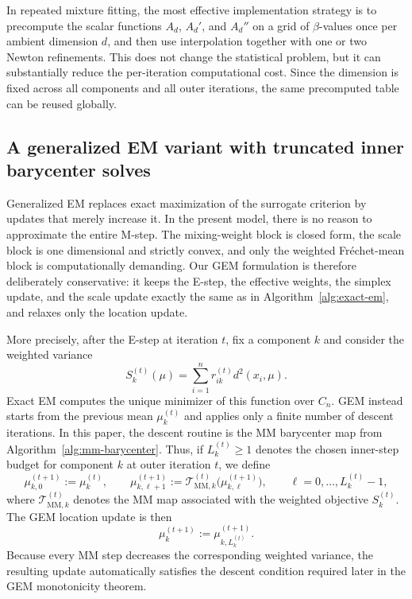 \documentclass[11pt]{article}
\begin{document}
In repeated mixture fitting, the most effective implementation strategy is to precompute the scalar functions \(A_d\), \(A_d'\), and \(A_d''\) on a grid of \(\beta\)-values once per ambient dimension \(d\), and then use interpolation together with one or two Newton refinements. This does not change the statistical problem, but it can substantially reduce the per-iteration computational cost. Since the dimension is fixed across all components and all outer iterations, the same precomputed table can be reused globally.

\subsection{A generalized EM variant with truncated inner barycenter solves}\label{subsec:gem}

Generalized EM replaces exact maximization of the surrogate criterion by updates that merely increase it. In the present model, there is no reason to approximate the entire M-step. The mixing-weight block is closed form, the scale block is one dimensional and strictly convex, and only the weighted Fr\'echet-mean block is computationally demanding. Our GEM formulation is therefore deliberately conservative: it keeps the E-step, the effective weights, the simplex update, and the scale update exactly the same as in Algorithm~\ref{alg:exact-em}, and relaxes only the location update.

More precisely, after the E-step at iteration \(t\), fix a component \(k\) and consider the weighted variance
\[
S_k^{(t)}(\mu)=\sum_{i=1}^n r_{ik}^{(t)}d^2(x_i,\mu).
\]
Exact EM computes the unique minimizer of this function over \(C_n\). GEM instead starts from the previous mean \(\mu_k^{(t)}\) and applies only a finite number of descent iterations. In this paper, the descent routine is the MM barycenter map from Algorithm~\ref{alg:mm-barycenter}. Thus, if \(L_k^{(t)}\ge 1\) denotes the chosen inner-step budget for component \(k\) at outer iteration \(t\), we define
\[
\mu_{k,0}^{(t+1)}:=\mu_k^{(t)},
\qquad
\mu_{k,\ell+1}^{(t+1)}
:=
\mathcal{T}_{\mathrm{MM},k}^{(t)}\bigl(\mu_{k,\ell}^{(t+1)}\bigr),
\qquad
\ell=0,\ldots,L_k^{(t)}-1,
\]
where \(\mathcal{T}_{\mathrm{MM},k}^{(t)}\) denotes the MM map associated with the weighted objective \(S_k^{(t)}\). The GEM location update is then
\begin{equation}\label{eq:gem-location-update}
\mu_k^{(t+1)}:=\mu_{k,L_k^{(t)}}^{(t+1)}.
\end{equation}
Because every MM step decreases the corresponding weighted variance, the resulting update automatically satisfies the descent condition required later in the GEM monotonicity theorem.
\end{document}
